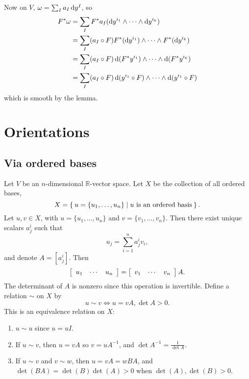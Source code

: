 \begin{enumerate}
{    Now on $V$, $\omega = \sum_I a_I \mathop{}\!\mathrm{d} y^I$, so
    \begin{align*}
       F^\ast \omega
    &= \sum_I
         F^\ast a_I
         (\dif y^{i_1} \wedge \cdots \wedge \dif y^{i_k}) \\
    &= \sum_I
         (a_I \circ F)
         F^\ast(\dif y^{i_1}) \wedge \cdots \wedge F^\ast(\dif
      y^{i_k}) \\
    &= \sum_I
         (a_I \circ F)
         \dif(F^\ast y^{i_1})
         \wedge \cdots \wedge
         \dif(F^\ast y^{i_k}) \\
    &= \sum_I
         (a_I \circ F)
         \dif(y^{i_1} \circ F)
         \wedge \cdots \wedge
         \dif(y^{i_1} \circ F)
    \end{align*}
    which is smooth by the lemma.
  }
\end{enumerate}

\section{Orientations}

\subsection{Via ordered bases}
Let $V$ be an $n$-dimensional $\mathbb{R}$-vector space. Let
$X$ be the collection of all ordered bases,
$$
  X
= \Set{ u = \{ u_1, \dots, u_n \} | \text{$u$ is an ordered basis} }.
$$
Let $u, v \in X$, with $u = \{u_1, \dots, u_n\}$ and
$v = \{v_1, \dots, v_n\}$. Then there exist unique scalars $a^i_j$
such that
$$
u_j = \sum_{i=1}^n a^i_j v_i,
$$
and denote $A = [a_j^i]$. Then
$$
  \left[
    \begin{array}{c c c}
      u_1 & \cdots & u_n
    \end{array}
  \right]
=
  \left[
    \begin{array}{c c c}
      v_1 & \cdots & v_n
    \end{array}
  \right]
  A.
$$
The determinant of $A$ is nonzero since this operation is
invertible. Define a relation $\sim$ on $X$ by
$$
u \sim v \iff u = vA, \det A > 0.
$$
This is an equivalence relation on $X$:
\begin{enumerate}
  \item{
    $u \sim u$ since $u = uI$.
  }
  \item{
    If $u \sim v$, then $u = vA$ so
    $v = uA^{-1}$, and $\det A^{-1} = \frac{1}{\det A}$.
  }
  \item{
    If $u \sim v$ and $v \sim w$, then
    $u = vA = wBA$, and $\det(BA) = \det(B)\det(A) > 0$ when
    $\det(A), \det(B) > 0$.
  }
\end{enumerate}


